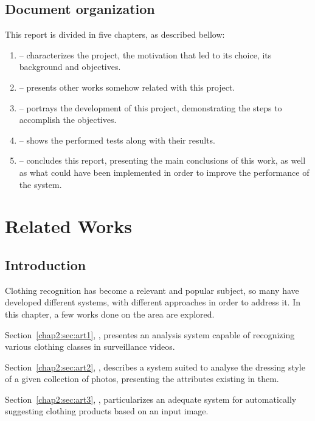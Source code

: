 \documentclass[titlepage,12pt,a4paper,times]{book}
\begin{document}
\section{Document organization}
\label{sec:organ}

This report is divided in five chapters, as described bellow:
\begin{enumerate}
	\item \textbf{} -- characterizes the project, the
		motivation that led to its choice, its background and objectives.
	\item \textbf{} -- presents other works somehow related
		with this project.
	\item \textbf{} -- portrays the development of this
		project, demonstrating the steps to accomplish the objectives.
	\item \textbf{} -- shows the performed tests along with
		their results.
	\item \textbf{} -- concludes this report, presenting the
		main conclusions of this work, as well as what could have been
		implemented in order to improve the performance of the system.
\end{enumerate}

\chapter{Related Works}
\label{chap:ow}

\section{Introduction}
\label{chap2:sec:intro}

Clothing recognition has become a relevant and popular subject, so many have
developed different systems, with different approaches in order to address it.
In this chapter, a few works done on the area are explored.

Section~\ref{chap2:sec:art1}, , presentes an
analysis system capable of recognizing various clothing classes in surveillance
videos.

Section~\ref{chap2:sec:art2}, , describes a system
suited to analyse the dressing style of a given collection of photos,
presenting the attributes existing in them.

Section~\ref{chap2:sec:art3}, , particularizes an
adequate system for automatically suggesting clothing products based on an
input image.
\end{document}
